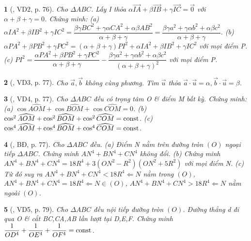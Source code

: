 \documentclass{article}
\newtheorem{baitoan}{}
\begin{document}
\begin{baitoan}[\cite{Hai_Hung_Thu_Tung2022_tap_1}, VD2, p. 76]
	Cho $\Delta ABC$. Lấy I thỏa $\alpha\overrightarrow{IA} + \beta\overrightarrow{IB} + \gamma\overrightarrow{IC} = \vec{0}$ với $\alpha + \beta + \gamma = 0$. Chứng minh: (a) $\alpha IA^2 + \beta IB^2 + \gamma IC^2 = \dfrac{\beta\gamma BC^2 + \gamma\alpha CA^2 + \alpha\beta AB^2}{\alpha + \beta + \gamma} = \dfrac{\beta\gamma a^2 + \gamma\alpha b^2 + \alpha\beta c^2}{\alpha + \beta + \gamma}$. (b) $\alpha PA^2 + \beta PB^2 + \gamma PC^2 = (\alpha + \beta + \gamma)PI^2 + \alpha IA^2 + \beta IB^2 + \gamma IC^2$ với mọi điểm P. (c) $PI^2 = \dfrac{\alpha PA^2 + \beta PB^2 + \gamma PC^2}{\alpha + \beta + \gamma} - \dfrac{\beta\gamma a^2 + \gamma\alpha b^2 + \alpha\beta c^2}{(\alpha + \beta + \gamma)^2}$ với mọi điểm P.
\end{baitoan}

\begin{baitoan}[\cite{Hai_Hung_Thu_Tung2022_tap_1}, VD3, p. 77]
	Cho $\vec{a},\vec{b}$ không cùng phương. Tìm $\vec{u}$ thỏa $\vec{a}\cdot\vec{u} = \alpha,\vec{b}\cdot\vec{u} = \beta$.
\end{baitoan}

\begin{baitoan}[\cite{Hai_Hung_Thu_Tung2022_tap_1}, VD4, p. 77]
	Cho $\Delta ABC$ đều có trọng tâm O \& điểm M bất kỳ. Chứng minh: (a) $\cos\widehat{AOM} + \cos\widehat{BOM} + \cos\widehat{COM} = 0$. (b) $\cos^2\widehat{AOM} + \cos^2\widehat{BOM} + \cos^2\widehat{COM} = {\rm const}$. (c) $\cos^4\widehat{AOM} + \cos^4\widehat{BOM} + \cos^4\widehat{COM} = {\rm const}$.
\end{baitoan}

\begin{baitoan}[\cite{Hai_Hung_Thu_Tung2022_tap_1}, BĐ, p. 77]
	Cho $\Delta ABC$ đều. (a) Điểm N nằm trên đường tròn $(O)$ ngoại tiếp $\Delta ABC$. Chứng minh $AN^4 + BN^4 + CN^4$ không đổi. (b) Chứng minh $AN^4 + BN^4 + CN^4 = 18R^4 + 3(ON^2 - R^2)(ON^2 + 5R^2)$ với mọi điểm N. (c) Từ đó suy ra $AN^4 + BN^4 + CN^4 < 18R^4\Leftarrow N$ nằm trong $(O)$, $AN^4 + BN^4 + CN^4 = 18R^4\Leftarrow N\in(O)$, $AN^4 + BN^4 + CN^4 > 18R^4\Leftarrow N$ nằm ngoài $(O)$.
\end{baitoan}

\begin{baitoan}[\cite{Hai_Hung_Thu_Tung2022_tap_1}, VD5, p. 79]
	Cho $\Delta ABC$ đều nội tiếp đường tròn $(O)$. Đường thẳng d đi qua O \& cắt BC,CA,AB lần lượt tại D,E,F. Chứng minh $\dfrac{1}{OD^4} + \dfrac{1}{OE^4} + \dfrac{1}{OF^4} = {\rm const}$.
\end{baitoan}
\end{document}
